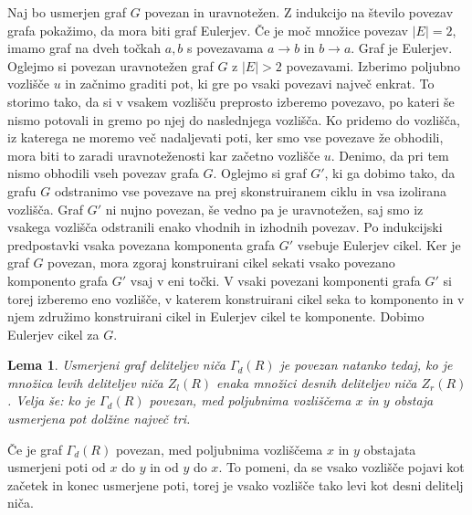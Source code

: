 \documentclass[a4paper, 12pt]{amsart}
\theoremstyle{definition} %
\theoremstyle{plain} %
\newtheorem{lema}[definicija]{Lema}
\begin{document}
Naj bo usmerjen graf $G$ povezan in uravnotežen. Z indukcijo na število povezav grafa pokažimo, da mora biti graf Eulerjev. Če je moč množice povezav $|E|=2$,  imamo graf na dveh točkah $a,b$ s povezavama $a\rightarrow b$ in $b\rightarrow a$. Graf je Eulerjev. Oglejmo si povezan uravnotežen graf $G$ z $|E|> 2$ povezavami. Izberimo poljubno vozlišče $u$ in začnimo graditi pot, ki gre po vsaki povezavi največ enkrat. To storimo tako, da si v vsakem vozlišču preprosto izberemo povezavo, po kateri še nismo potovali in gremo po njej do naslednjega vozlišča. Ko pridemo do vozlišča, iz katerega ne moremo več nadaljevati poti, ker smo vse povezave že obhodili, mora biti to zaradi uravnoteženosti kar začetno vozlišče $u$. Denimo, da pri tem nismo obhodili vseh povezav grafa $G$. Oglejmo si graf $G'$, ki ga dobimo tako, da grafu $G$ odstranimo vse povezave na prej skonstruiranem ciklu in vsa izolirana vozlišča. Graf $G'$ ni nujno povezan, še vedno pa je uravnotežen, saj smo iz vsakega vozlišča odstranili enako vhodnih in izhodnih povezav. Po indukcijski predpostavki vsaka povezana komponenta grafa $G'$ vsebuje Eulerjev cikel. Ker je graf $G$ povezan, mora zgoraj konstruirani cikel sekati vsako povezano komponento grafa $G'$ vsaj v eni točki. V vsaki povezani komponenti grafa $G'$ si torej izberemo eno vozlišče, v katerem konstruirani cikel seka to komponento in v njem združimo konstruirani cikel in Eulerjev cikel te komponente. Dobimo Eulerjev cikel za $G$.
\endproof

\begin{lema}
\label{usmerjeniGrafDeliteljevNicaPovezanost}
Usmerjeni graf deliteljev niča $\Gamma_d(R)$ je povezan natanko tedaj, ko je množica levih deliteljev niča $Z_l(R)$ enaka množici desnih deliteljev niča $Z_r(R)$. Velja še: ko je $\Gamma_d(R)$ povezan, med poljubnima vozliščema $x$ in $y$ obstaja usmerjena pot dolžine največ tri.
\end{lema}

\proof
Če je graf $\Gamma_d(R)$ povezan, med poljubnima vozliščema $x$ in $y$ obstajata usmerjeni poti od $x$ do $y$ in od $y$ do $x$. To pomeni, da se vsako vozlišče pojavi kot začetek in konec usmerjene poti, torej  je vsako vozlišče tako levi kot desni delitelj niča. 
\end{document}
